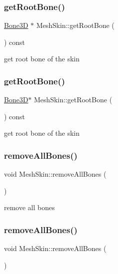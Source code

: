 \subsubsection{\texorpdfstring{get\+Root\+Bone()}{getRootBone()}\hspace{0.1cm}{\footnotesize\ttfamily [1/2]}}
{\footnotesize\ttfamily \hyperlink{classBone3D}{Bone3D} $\ast$ Mesh\+Skin\+::get\+Root\+Bone (\begin{DoxyParamCaption}{ }\end{DoxyParamCaption}) const}

get root bone of the skin \mbox{\label{classMeshSkin_a9741f7732d958d7b98b04907f5a20fb8}} 
\subsubsection{\texorpdfstring{get\+Root\+Bone()}{getRootBone()}\hspace{0.1cm}{\footnotesize\ttfamily [2/2]}}
{\footnotesize\ttfamily \hyperlink{classBone3D}{Bone3D}$\ast$ Mesh\+Skin\+::get\+Root\+Bone (\begin{DoxyParamCaption}{ }\end{DoxyParamCaption}) const}

get root bone of the skin \mbox{\label{classMeshSkin_add548f76d7d93110413d5da980c9efb0}} 
\subsubsection{\texorpdfstring{remove\+All\+Bones()}{removeAllBones()}\hspace{0.1cm}{\footnotesize\ttfamily [1/2]}}
{\footnotesize\ttfamily void Mesh\+Skin\+::remove\+All\+Bones (\begin{DoxyParamCaption}{ }\end{DoxyParamCaption})}

remove all bones \mbox{\label{classMeshSkin_add548f76d7d93110413d5da980c9efb0}} 
\subsubsection{\texorpdfstring{remove\+All\+Bones()}{removeAllBones()}\hspace{0.1cm}{\footnotesize\ttfamily [2/2]}}
{\footnotesize\ttfamily void Mesh\+Skin\+::remove\+All\+Bones (\begin{DoxyParamCaption}{ }\end{DoxyParamCaption})}


